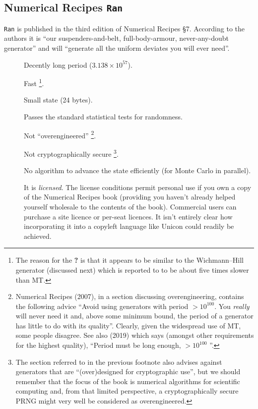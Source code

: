 \documentclass[letterpaper,12pt]{article}
\begin{document}
\subsection{Numerical Recipes \texttt{Ran}}
\texttt{Ran} is published in the third edition of Numerical Recipes
\cite{PressEtAl:numericalRecipes} \S 7. According to the authors it is
``our suspenders-and-belt, full-body-armour, never-any-doubt generator''
and will ``generate all the uniform deviates you will ever need''.
\begin{description}
\item[\GoodThing]
  Decently long period ($3.138 \times 10^{57}$).
\item[\PossiblyGoodThing]
  Fast%
  \footnote{
    The reason for the {\bf ?} is that it appears to be similar to the
    Wichmann--Hill generator (discussed next) which is reported to to be
    about five times slower than MT.
    }.
\item[\GoodThing]
  Small state (24 bytes).
\item[\GoodThing]
  Passes the standard statistical tests for randomness.
\item[\PossiblyGoodThing]
  Not ``overengineered''%
  \footnote{
    Numerical Recipes (2007), in a section discussing overengineering, contains
    the following advice ``Avoid using generators with period $>
    10^{100}$. You {\em really} will never need it and, above some minimum
    bound, the period of a generator has little to do with its quality''.
    Clearly, given the widespread use of MT, some people disagree. See also
    \cite{James:HighQualityRNGs}(2019) which says (amongst other requirements
    for the highest quality), ``Period must be long enough, $> 10^{100}$ ''.
  }.

\item[\PossiblyBadThing]
  Not cryptographically secure%
  \footnote{
    The section referred to in the previous footnote also advises against
    generators that are ``(over)designed for cryptographic use'', but we
    should remember that the focus of the book is numerical algorithms for
    scientific computing and, from that limited perspective, a
    cryptographically secure PRNG might very well be considered as
    overengineered.
  }.

\item[\PossiblyBadThing]
  No algorithm to advance the state efficiently (for Monte Carlo in parallel).

\item[\BadThing]
  It is {\em licensed}. The license conditions permit personal use if you
  own a copy of the Numerical Recipes book (providing you haven't already
  helped yourself wholesale to the contents of the book).  Commercial users
  can purchase a site licence or per-seat licences. It isn't entirely clear
  how incorporating it into a copyleft language like Unicon could readily
  be achieved.


\end{description}
\end{document}
